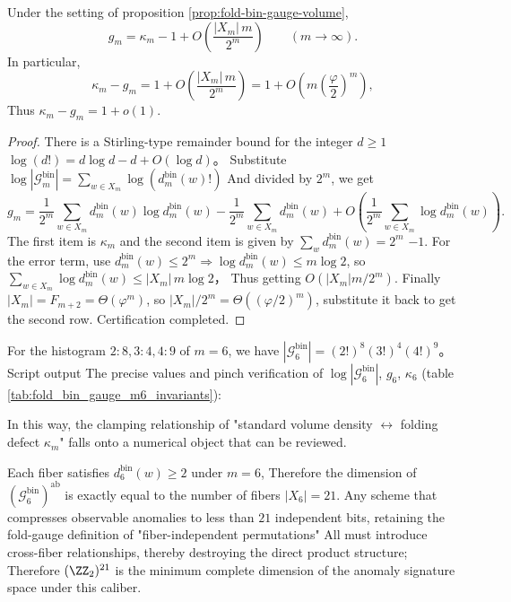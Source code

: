 \begin{theorem}\label{thm:fold-bin-gauge-volume-stirling}
Under the setting of proposition \ref{prop:fold-bin-gauge-volume},
\[
g_m=\kappa_m-1+O\!\left(\frac{|X_m|\,m}{2^m}\right)\qquad(m\to\infty).
\]
In particular,
\[
\kappa_m-g_m
=1+O\!\left(\frac{|X_m|\,m}{2^m}\right)
=1+O\!\left(m\left(\frac{\varphi}{2}\right)^m\right),
\]
Thus \(\kappa_m-g_m=1+o(1)\).
\end{theorem}
\begin{proof}
There is a Stirling-type remainder bound for the integer \(d\ge 1\)
\(
\log(d!)=d\log d-d+O(\log d)
\)。
Substitute
\(
\log|\mathcal{G}^{\mathrm{bin}}_m|
=\sum_{w\in X_m}\log(d^{\mathrm{bin}}_m(w)!)
\)
And divided by \(2^m\), we get
\[
g_m
=\frac{1}{2^m}\sum_{w\in X_m}d^{\mathrm{bin}}_m(w)\log d^{\mathrm{bin}}_m(w)
-\frac{1}{2^m}\sum_{w\in X_m}d^{\mathrm{bin}}_m(w)
 +O\!\left(\frac{1}{2^m}\sum_{w\in X_m}\log d^{\mathrm{bin}}_m(w)\right).
\]
The first item is \(\kappa_m\) and the second item is given by \(\sum_w d^{\mathrm{bin}}_m(w)=2^m\) \(-1\).
For the error term, use \(d^{\mathrm{bin}}_m(w)\le 2^m\Rightarrow \log d^{\mathrm{bin}}_m(w)\le m\log 2\), so
\(
\sum_{w\in X_m}\log d^{\mathrm{bin}}_m(w)\le |X_m|\,m\log 2
\)，
Thus getting \(O(|X_m|m/2^m)\).
Finally \(|X_m|=F_{m+2}=\Theta(\varphi^m)\), so \(|X_m|/2^m=\Theta((\varphi/2)^m)\), substitute it back to get the second row. Certification completed.
\end{proof}

\begin{remark}[\texorpdfstring{$m=6$}{m=6}’s gauge volume value anchor point]\label{rem:fold-bin-gauge-volume-m6}
For the histogram \(2:8,3:4,4:9\) of \(m=6\), we have
\(
|\mathcal{G}^{\mathrm{bin}}_6|=(2!)^{8}(3!)^{4}(4!)^{9}
\)。
Script \texttt{} output
The precise values ​​and pinch verification of \(\log|\mathcal{G}^{\mathrm{bin}}_6|\), \(g_6\), \(\kappa_6\) (table \ref{tab:fold_bin_gauge_m6_invariants}):

In this way, the clamping relationship of "standard volume density \(\leftrightarrow\) folding defect \(\kappa_m\)" falls onto a numerical object that can be reviewed.
\end{remark}

\begin{remark}[Incompressibility of exception signature dimension (\texorpdfstring{$m=6$}{m=6})]\label{rem:fold-bin-gauge-rigidity}
Each fiber satisfies \(d^{\mathrm{bin}}_6(w)\ge 2\) under \(m=6\),
Therefore the dimension of \((\mathcal{G}^{\mathrm{bin}}_6)^{\mathrm{ab}}\) is exactly equal to the number of fibers \(|X_6|=21\).
Any scheme that compresses observable anomalies to less than \(21\) independent bits, retaining the fold-gauge definition of "fiber-independent permutations"
All must introduce cross-fiber relationships, thereby destroying the direct product structure;
Therefore \((\ZZ_2)^{21}\) is the minimum complete dimension of the anomaly signature space under this caliber.
\end{remark}


